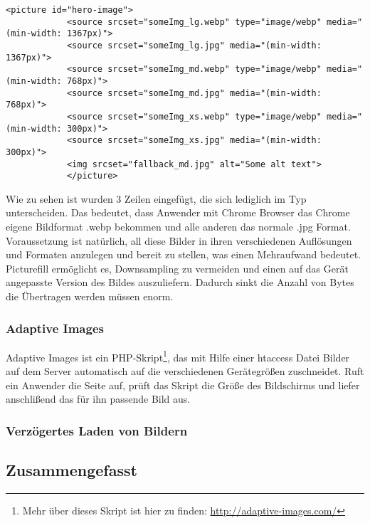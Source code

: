			\begin{lstlisting}[captionpos=b, caption=Srcset mit webp, label=lst:srcsetWebp]
			<picture id="hero-image">
		    <source srcset="someImg_lg.webp" type="image/webp" media="(min-width: 1367px)">
		    <source srcset="someImg_lg.jpg" media="(min-width: 1367px)">
		    <source srcset="someImg_md.webp" type="image/webp" media="(min-width: 768px)">
		    <source srcset="someImg_md.jpg" media="(min-width: 768px)">
		    <source srcset="someImg_xs.webp" type="image/webp" media="(min-width: 300px)">
		    <source srcset="someImg_xs.jpg" media="(min-width: 300px)">
		    <img srcset="fallback_md.jpg" alt="Some alt text">
			</picture>
			\end{lstlisting}

			Wie zu sehen ist wurden 3 Zeilen eingefügt, die sich lediglich im Typ unterscheiden. Das bedeutet, dass Anwender mit Chrome Browser das Chrome eigene Bildformat .webp bekommen und alle anderen das normale .jpg Format. Voraussetzung ist natürlich, all diese Bilder in ihren verschiedenen Auflösungen und Formaten anzulegen und bereit zu stellen, was einen Mehraufwand bedeutet.
			Picturefill ermöglicht es, Downsampling zu vermeiden und einen auf das Gerät angepasste Version des Bildes auszuliefern. Dadurch sinkt die Anzahl von Bytes die Übertragen werden müssen enorm.


		\subsubsection{Adaptive Images} %
		\label{ssub:adaptive_images}
			Adaptive Images ist ein PHP-Skript\footnote{Mehr über dieses Skript ist hier zu finden: \url{http://adaptive-images.com/}}, das mit Hilfe einer htaccess Datei Bilder auf dem Server automatisch auf die verschiedenen Gerätegrößen zuschneidet. Ruft ein Anwender die Seite auf, prüft das Skript die Größe des Bildschirms und liefer anschlißend das für ihn passende Bild aus. 


		\subsubsection{Verzögertes Laden von Bildern} %
		\label{ssub:verzögertes_laden_von_bildern}
			

		\subsection{Zusammengefasst} %
		\label{sub:zusammengefasst}
		


